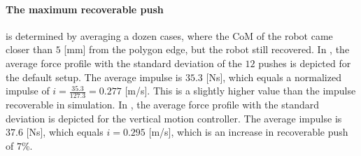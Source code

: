 \paragraph{The maximum recoverable push} is determined by averaging a dozen cases, where the \ac{CoM} of the robot came closer than $5$ [mm] from the polygon edge, but the robot still recovered. In , the average force profile with the standard deviation of the $12$ pushes is depicted for the default setup. The average impulse is $35.3$ [Ns], which equals a normalized impulse of $i=\frac{35.3}{127.3}=0.277$ [m/s]. This is a slightly higher value than the impulse recoverable in simulation. In , the average force profile with the standard deviation is depicted for the vertical motion controller. The average impulse is $37.6$ [Ns], which equals $i=0.295$ [m/s], which is an increase in recoverable push of $7$\%.
